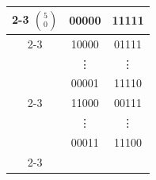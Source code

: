 \begin{center}
\renewcommand{\arraystretch}{1.5}
\begin{tabular}{c | c | c |}
    \cline{2-3}
    $\displaystyle\binom{5}{0}$ & 00000 & 11111 \\ \cline{2-3}
    \multirow{3}{*}{$\displaystyle\binom{5}{1}$} & 10000 & 01111 \\ 
    & \vdots & \vdots \\ 
    & 00001 & 11110 \\ \cline{2-3}
    \multirow{3}{*}{$\displaystyle\binom{5}{2}$} & 11000 & 00111 \\ 
    & \vdots & \vdots \\ 
    & 00011 & 11100 \\ \cline{2-3}
\end{tabular}
\end{center}